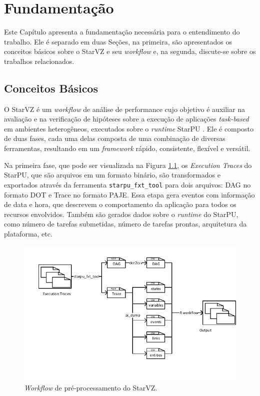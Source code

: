 
\chapter{Fundamentação} \label{ch:fundamentation}

Este Capítulo apresenta a fundamentação necessária para o entendimento do trabalho. 
Ele é separado em duas Seções, na primeira, são apresentados os conceitos básicos 
sobre o StarVZ e seu \emph{workflow} e, na segunda, discute-se sobre os trabalhos 
relacionados.

\section{Conceitos Básicos} \label{sect:basic-concepts}

O StarVZ \cite{ref:starvz} é um \emph{workflow} de análise de performance cujo 
objetivo é auxiliar na avaliação e na verificação de hipóteses sobre a execução de 
aplicações \emph{task-based} em ambientes heterogêneos, executados sobre o
\emph{runtime} StarPU \cite{ref:starpu}. Ele é composto de duas fases, cada uma 
delas composta de uma combinação de diversas ferramentas, resultando em um \emph{framework}
rápido, consistente, flexível e versátil.

Na primeira fase, que pode ser visualizada na Figura \ref{fig:starvz-workflow1}, os 
\emph{Execution Traces} do StarPU, que são arquivos em um formato binário, são transformados
e exportados através da ferramenta \texttt{starpu\_fxt\_tool} para dois arquivos: DAG no formato DOT 
e Trace no formato PAJE. Essa etapa gera eventos com informação de data e hora, que 
descrevem o comportamento da aplicação para todos os recursos envolvidos. Também são gerados 
dados sobre o \emph{runtime} do StarPU, como número de tarefas submetidas,
número de tarefas prontas, arquitetura da plataforma, etc.

\begin{figure}[ht]
 \centerline{\includegraphics[width=1\textwidth]{./img/step1-final.pdf}}
 \caption{\emph{Workflow} de pré-processamento do StarVZ.}
 \label{fig:starvz-workflow1}
\end{figure}

